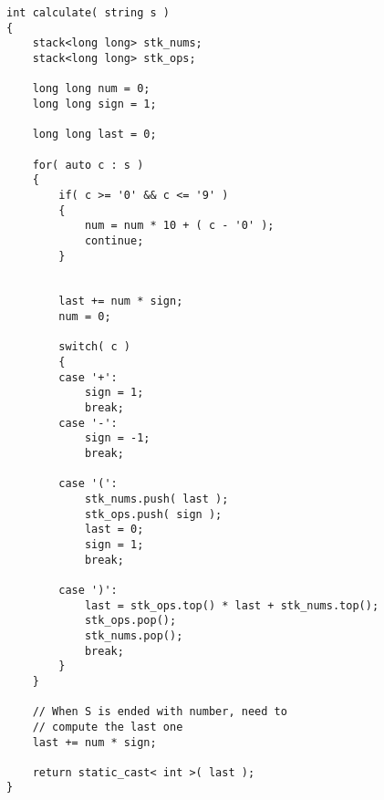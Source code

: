 \begin{lstlisting}[style=customc, caption={Stack}]
int calculate( string s )
{
    stack<long long> stk_nums;
    stack<long long> stk_ops;

    long long num = 0;
    long long sign = 1;

    long long last = 0;

    for( auto c : s )
    {
        if( c >= '0' && c <= '9' )
        {
            num = num * 10 + ( c - '0' );
            continue;
        }


        last += num * sign;
        num = 0;

        switch( c )
        {
        case '+':
            sign = 1;
            break;
        case '-':
            sign = -1;
            break;

        case '(':
            stk_nums.push( last );
            stk_ops.push( sign );
            last = 0;
            sign = 1;
            break;

        case ')':
            last = stk_ops.top() * last + stk_nums.top();
            stk_ops.pop();
            stk_nums.pop();
            break;
        }
    }

	// When S is ended with number, need to 
	// compute the last one
    last += num * sign;

    return static_cast< int >( last );
}
\end{lstlisting}